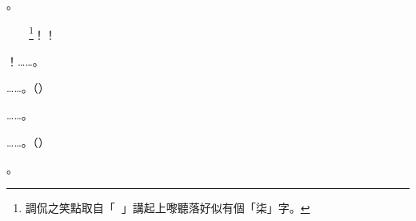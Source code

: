 \begin{dialogue}
。
\end{dialogue}
\begin{dialogue}
！󲉖󱈍，󲉖󱈍 \footnote{調侃之笑點取自「󲉖󱈍」講起上嚟聽落好似有個「柒」字。}！！
\end{dialogue}
\begin{dialogue}
！……。
\end{dialogue}
\begin{dialogue}
……。（）
\end{dialogue}
\begin{dialogue}
……。
\end{dialogue}
\begin{dialogue}
……。（）
\end{dialogue}
\begin{dialogue}
。
\end{dialogue}



